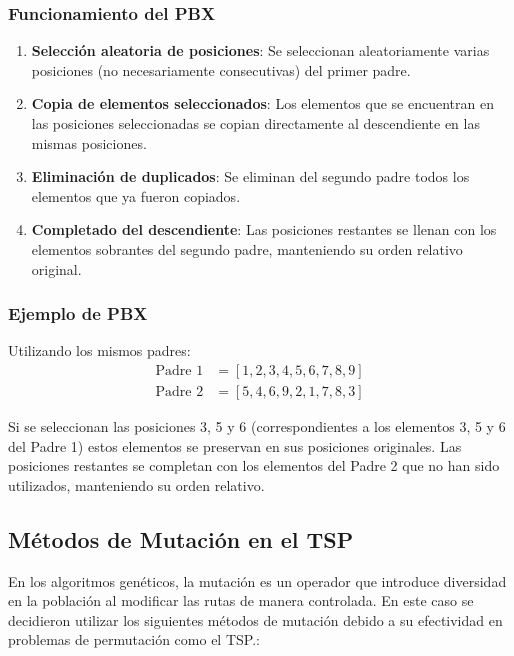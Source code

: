 \subsubsection{Funcionamiento del PBX}\label{intro_pbx}

\begin{enumerate}
    \item \textbf{Selección aleatoria de posiciones}: Se seleccionan aleatoriamente varias posiciones (no necesariamente consecutivas) del primer padre.
    
    \item \textbf{Copia de elementos seleccionados}: Los elementos que se encuentran en las posiciones seleccionadas se copian directamente al descendiente en las mismas posiciones.
    
    \item \textbf{Eliminación de duplicados}: Se eliminan del segundo padre todos los elementos que ya fueron copiados.
    
    \item \textbf{Completado del descendiente}: Las posiciones restantes se llenan con los elementos sobrantes del segundo padre, manteniendo su orden relativo original.
\end{enumerate}

\subsubsection{Ejemplo de PBX}

Utilizando los mismos padres:
\begin{align}
\text{Padre 1} &= [1, 2, 3, 4, 5, 6, 7, 8, 9] \\
\text{Padre 2} &= [5, 4, 6, 9, 2, 1, 7, 8, 3]
\end{align}

Si se seleccionan las posiciones 3, 5 y 6 (correspondientes a los elementos 3, 5 y 6 del Padre 1) estos elementos se preservan en sus posiciones originales. Las posiciones restantes se completan con los elementos del Padre 2 que no han sido utilizados, manteniendo su orden relativo.


\subsection{Métodos de Mutación en el TSP}

En los algoritmos genéticos, la mutación es un operador que introduce diversidad en la población al modificar las rutas de manera controlada.
En este caso se decidieron utilizar los siguientes métodos de mutación debido a su efectividad en problemas de permutación como el TSP.\@:

